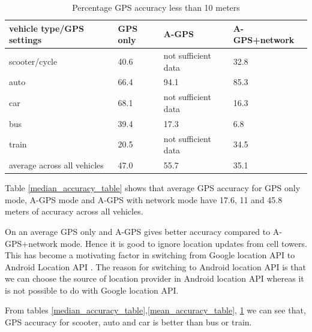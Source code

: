 \documentclass[12pt]{report}
\begin{document}
 
 \begin{table}[h]
   \centering
   \caption{Percentage GPS accuracy less than 10 meters}
   \label{gps_accuracy_table}
   \begin{tabular}{|l|l|l|l|}
     \hline
     vehicle type/GPS settings   & GPS only & A-GPS        & A-GPS+network \\\hline
     scooter/cycle               & 40.6     & not sufficient data & 32.8                 \\\hline
     auto                        & 66.4     & 94.1                & 85.3                 \\\hline
     car                         & 68.1     & not sufficient data & 16.3                 \\\hline
     bus                         & 39.4     & 17.3                & 6.8                  \\\hline
     train                       & 20.5     & not sufficient data & 34.5                 \\\hline
     average across all vehicles & 47.0     & 55.7                & 35.1 
     \\ \hline
   \end{tabular}
 \end{table}
 \pagebreak


 Table \ref{median_accuracy_table} shows that average GPS accuracy for GPS only
 mode, A-GPS mode and A-GPS with network mode have 17.6, 11 and 45.8 meters of
 accuracy across all vehicles.

 On an average GPS only and A-GPS gives better accuracy compared to
 A-GPS+network mode. Hence it is good to ignore location updates from cell
 towers. This has become a motivating factor in switching from Google location
 API \cite[]{google_location_api} to Android Location API
 \cite[]{android_location_api}. The reason for switching to Android location API
 is that we can choose the source of location provider in Android location API
 whereas it is not possible to do with Google location API.


 From tables \ref{median_accuracy_table},\ref{mean_accuracy_table},
 \ref{gps_accuracy_table} we can see that, GPS accuracy for scooter, auto and
 car is better than bus or train.

\end{document}
